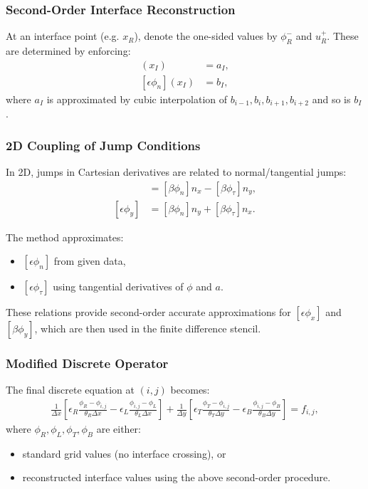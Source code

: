 \subsubsection{Second-Order Interface Reconstruction}

At an interface point (e.g. $x_R$), denote the one-sided values by $\phi^-_R$ and $u^+_R$. These are determined by enforcing:
\begin{align}
	[\phi](x_I)            & = a_I, \\
	[\epsilon \phi_n](x_I) & = b_I,
\end{align}
where $a_I$ is approximated by cubic interpolation of $b_{i-1}, b_{i}, b_{i+1}, b_{i+2}$ and so is $b_I$.

\subsubsection{2D Coupling of Jump Conditions}

In 2D, jumps in Cartesian derivatives are related to normal/tangential jumps:
\begin{align}
	[\epsilon \phi_x] & = [\beta \phi_n] n_x - [\beta \phi_\tau] n_y, \\
	[\epsilon \phi_y] & = [\beta \phi_n] n_y + [\beta \phi_\tau] n_x.
\end{align}

The method approximates:
\begin{itemize}
	\item $[\epsilon \phi_n]$ from given data,
	\item $[\epsilon \phi_\tau]$ using tangential derivatives of $\phi$ and $a$.
\end{itemize}

These relations provide second-order accurate approximations for $[\epsilon \phi_x]$ and $[\beta \phi_y]$, which are then used in the finite difference stencil.

\subsubsection{Modified Discrete Operator}

The final discrete equation at $(i,j)$ becomes:
\begin{align}
	\frac{1}{\Delta x}
	\left[
		\epsilon_R \frac{\phi_R - \phi_{i,j}}{\theta_R \Delta x}
		-
		\epsilon_L \frac{\phi_{i,j} - \phi_L}{\theta_L \Delta x}
		\right]
	+
	\frac{1}{\Delta y}
	\left[
		\epsilon_T \frac{\phi_T - \phi_{i,j}}{\theta_T \Delta y}
		-
		\epsilon_B \frac{\phi_{i,j} - \phi_B}{\theta_B \Delta y}
		\right]
	= f_{i,j},
\end{align}
where $\phi_R, \phi_L, \phi_T, \phi_B$ are either:
\begin{itemize}
	\item standard grid values (no interface crossing), or
	\item reconstructed interface values using the above second-order procedure.
\end{itemize}
